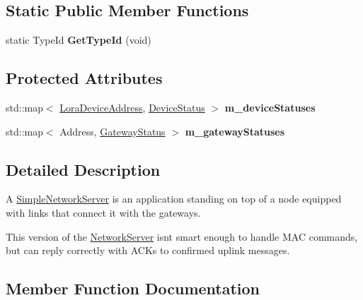 \subsection*{Static Public Member Functions}
\begin{DoxyCompactItemize}
\item 
\mbox{\label{classns3_1_1lorawan_1_1SimpleNetworkServer_a13d55fb0edd5fbe95e1a0ddd4f875517}} 
static Type\+Id {\bfseries Get\+Type\+Id} (void)
\end{DoxyCompactItemize}
\subsection*{Protected Attributes}
\begin{DoxyCompactItemize}
\item 
\mbox{\label{classns3_1_1lorawan_1_1SimpleNetworkServer_a7b268ca5a0d53ac5252c0d1452e51d97}} 
std\+::map$<$ \hyperlink{classns3_1_1lorawan_1_1LoraDeviceAddress}{Lora\+Device\+Address}, \hyperlink{classns3_1_1lorawan_1_1DeviceStatus}{Device\+Status} $>$ {\bfseries m\+\_\+device\+Statuses}
\item 
\mbox{\label{classns3_1_1lorawan_1_1SimpleNetworkServer_aa6859f00a0b25e12439bfa5e1460c176}} 
std\+::map$<$ Address, \hyperlink{classns3_1_1lorawan_1_1GatewayStatus}{Gateway\+Status} $>$ {\bfseries m\+\_\+gateway\+Statuses}
\end{DoxyCompactItemize}


\subsection{Detailed Description}
A \hyperlink{classns3_1_1lorawan_1_1SimpleNetworkServer}{Simple\+Network\+Server} is an application standing on top of a node equipped with links that connect it with the gateways.

This version of the \hyperlink{classns3_1_1lorawan_1_1NetworkServer}{Network\+Server} isn\textquotesingle{}t smart enough to handle M\+AC commands, but can reply correctly with A\+C\+Ks to confirmed uplink messages. 

\subsection{Member Function Documentation}
\mbox{\label{classns3_1_1lorawan_1_1SimpleNetworkServer_ae4c1abffbbac9ea1eae37371d14b454c}} 
